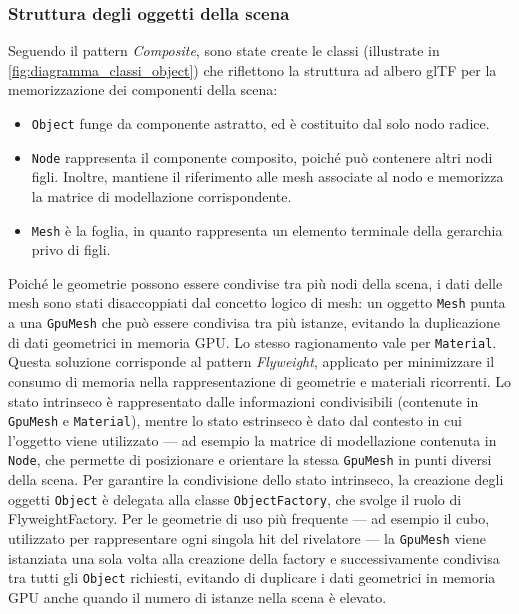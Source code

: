 \subsubsection{Struttura degli oggetti della scena}

Seguendo il pattern \emph{Composite}, sono state create le classi (illustrate in \cref{fig:diagramma_classi_object}) che riflettono la struttura ad albero glTF per la memorizzazione dei componenti della scena:
\begin{itemize}
    \item \texttt{Object} funge da componente astratto, ed è costituito dal solo nodo radice.
    \item \texttt{Node} rappresenta il componente composito, poiché può contenere altri nodi figli. Inoltre, mantiene il riferimento alle mesh associate al nodo e memorizza la matrice di modellazione corrispondente.
    \item \texttt{Mesh} è la foglia, in quanto rappresenta un elemento terminale della gerarchia privo di figli.
\end{itemize}

Poiché le geometrie possono essere condivise tra più nodi della scena, i dati delle mesh sono stati disaccoppiati dal concetto logico di mesh: un oggetto \texttt{Mesh} punta a una \texttt{GpuMesh} che può essere condivisa tra più istanze, evitando la duplicazione di dati geometrici in memoria GPU.
Lo stesso ragionamento vale per \texttt{Material}.
Questa soluzione corrisponde al pattern \emph{Flyweight}, applicato per minimizzare il consumo di memoria nella rappresentazione di geometrie e materiali ricorrenti.
Lo stato intrinseco è rappresentato dalle informazioni condivisibili (contenute in \texttt{GpuMesh} e \texttt{Material}), mentre lo stato estrinseco è dato dal contesto in cui l'oggetto viene utilizzato — ad esempio la matrice di modellazione contenuta in \texttt{Node}, che permette di posizionare e orientare la stessa \texttt{GpuMesh} in punti diversi della scena.
Per garantire la condivisione dello stato intrinseco, la creazione degli oggetti \texttt{Object} è delegata alla classe \texttt{ObjectFactory}, che svolge il ruolo di FlyweightFactory.
Per le geometrie di uso più frequente — ad esempio il cubo, utilizzato per rappresentare ogni singola hit del rivelatore — la \texttt{GpuMesh} viene istanziata una sola volta alla creazione della factory e successivamente condivisa tra tutti gli \texttt{Object} richiesti, evitando di duplicare i dati geometrici in memoria GPU anche quando il numero di istanze nella scena è elevato.

